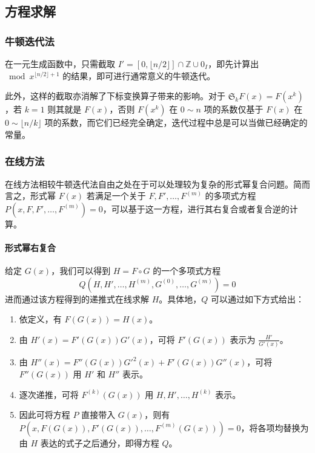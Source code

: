 \subsection{方程求解}

\subsubsection{牛顿迭代法}

在一元生成函数中，只需截取 $I' = [0, \lfloor n/2\rfloor] \cap \mathbb Z \cup 0_I$，即先计算出 $\bmod x^{\lfloor n/2\rfloor+1}$ 的结果，即可进行通常意义的牛顿迭代。

此外，这样的截取亦消解了下标变换算子带来的影响。对于 $\mathfrak S_k F(x) = F(x^k)$，若 $k=1$ 则其就是 $F(x)$，否则 $F(x^k)$ 在 $0\sim n$ 项的系数仅基于 $F(x)$ 在 $0 \sim \lfloor n/k\rfloor$ 项的系数，而它们已经完全确定，迭代过程中总是可以当做已经确定的常量。

\subsubsection{在线方法}

在线方法相较牛顿迭代法自由之处在于可以处理较为复杂的形式幂复合问题。简而言之，形式幂 $F(x)$ 若满足一个关于 $F,F',\dots,F^{(m)}$ 的多项式方程 $P(x,F,F',\dots,F^{(m)})=0$，可以基于这一方程，进行其右复合或者复合逆的计算。

\paragraph{形式幂右复合}

给定 $G(x)$，我们可以得到 $H=F\circ G$ 的一个多项式方程
$$Q(H,H',\dots,H^{(m)},G^{(0)},\dots,G^{(m)})=0$$
进而通过该方程得到的递推式在线求解 $H$。具体地，$Q$ 可以通过如下方式给出：
\begin{enumerate}
\item 依定义，有 $F(G(x)) = H(x)$。
\item 由 $H'(x) = F'(G(x))G'(x)$，可将 $F'(G(x))$ 表示为 $\frac{H'}{G'(x)}$。
\item 由 $H''(x) = F''(G(x))G'^2(x) + F'(G(x))G''(x)$，可将 $F''(G(x))$ 用 $H'$ 和 $H''$ 表示。
\item 逐次递推，可将 $F^{(k)}(G(x))$ 用 $H,H',\dots,H^{(k)}$ 表示。
\item 因此可将方程 $P$ 直接带入 $G(x)$，则有 $P(x,F(G(x)),F'(G(x)),\dots,F^{(m)}(G(x))) = 0$，将各项均替换为由 $H$ 表达的式子之后通分，即得方程 $Q$。
\end{enumerate}

